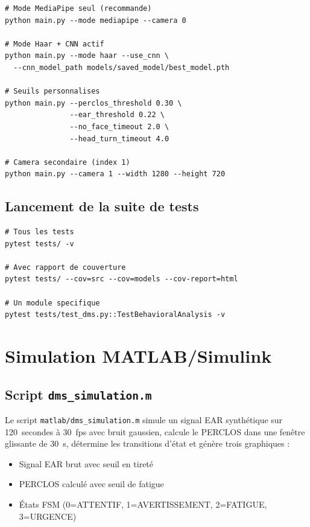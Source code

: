 \documentclass[12pt,a4paper]{report}
\begin{document}
\begin{lstlisting}[style=python, caption={Exemples d'utilisation du DMS}, label=lst:examples]
# Mode MediaPipe seul (recommande)
python main.py --mode mediapipe --camera 0

# Mode Haar + CNN actif
python main.py --mode haar --use_cnn \
  --cnn_model_path models/saved_model/best_model.pth

# Seuils personnalises
python main.py --perclos_threshold 0.30 \
               --ear_threshold 0.22 \
               --no_face_timeout 2.0 \
               --head_turn_timeout 4.0

# Camera secondaire (index 1)
python main.py --camera 1 --width 1280 --height 720
\end{lstlisting}

\subsection{Lancement de la suite de tests}

\begin{lstlisting}[style=python, caption={Execution des tests unitaires et de couverture}, label=lst:pytest]
# Tous les tests
pytest tests/ -v

# Avec rapport de couverture
pytest tests/ --cov=src --cov=models --cov-report=html

# Un module specifique
pytest tests/test_dms.py::TestBehavioralAnalysis -v
\end{lstlisting}

\section{Simulation MATLAB/Simulink}

\subsection{Script \texttt{dms\_simulation.m}}

Le script \texttt{matlab/dms\_simulation.m} simule un signal EAR synth\'etique sur 120~secondes \`a 30~fps avec bruit gaussien, calcule le PERCLOS dans une fen\^etre glissante de 30~s, d\'etermine les transitions d'\'etat et g\'en\`ere trois graphiques :
\begin{itemize}
  \item Signal EAR brut avec seuil en tiret\'e
  \item PERCLOS calcul\'e avec seuil de fatigue  
  \item \'Etats FSM (0=ATTENTIF, 1=AVERTISSEMENT, 2=FATIGUE, 3=URGENCE)
\end{itemize}
\end{document}
